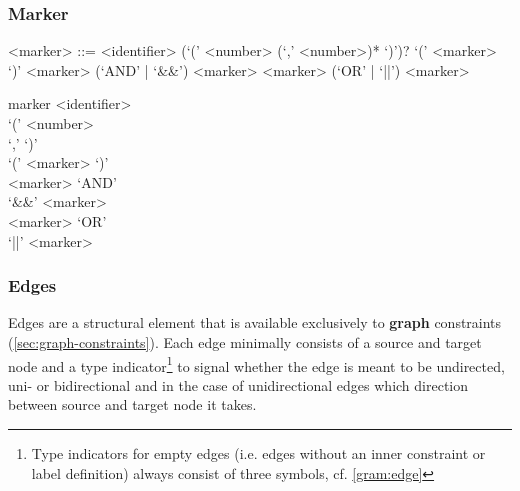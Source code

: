 \documentclass[11pt,a4paper]{report}
\begin{document}
\subsubsection{Marker}
\label{sec:marker}

\begin{gram}
	\label{gram:marker}
	\begin{grammar}	
		<marker> ::= <identifier> (`(' <number> (`,' <number>)* `)')?
		\alt `(' <marker> `)'
		\alt <marker> (`AND' | `\&\&') <marker>
		\alt <marker> (`OR' | `||') <marker>
	\end{grammar}
	\diagsep
	\begin{rrdiag*}{marker}
		\sst 
		<identifier> \sst \\ `(' \srp <number> \\ `,' \erp `)' \est \\
		`(' <marker> `)' \\
		<marker> \sst `AND' \\ `\&\&' \est <marker> \\
		<marker> \sst `OR' \\ `||' \est <marker> 
		\est
	\end{rrdiag*}
\end{gram}

\subsubsection{Edges}
\label{sec:edges}
Edges are a structural element that is available exclusively to \textbf{graph} constraints (\ref{sec:graph-constraints}).
Each edge minimally consists of a source and target node and a type indicator\footnote{Type indicators for empty edges (i.e. edges without an inner constraint or label definition) always consist of three symbols, cf. \cref{gram:edge}} to signal whether the edge is meant to be undirected, uni- or bidirectional and in the case of unidirectional edges which direction between source and target node it takes.
\end{document}
